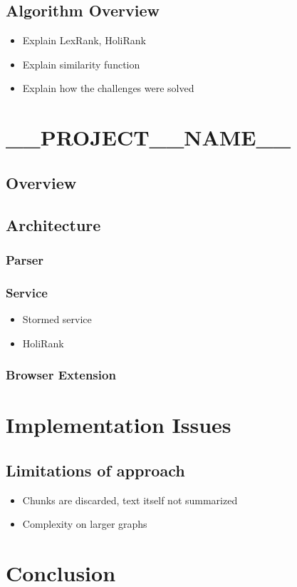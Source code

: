 \documentclass[a4paper]{usiinfbachelorproject}
\newcommand{\projectName}{\_\_PROJECT\_\_NAME\_\_}
\begin{document}
\subsection{Algorithm Overview}
\begin{itemize}
\item Explain LexRank, HoliRank
\item Explain similarity function
\item Explain how the challenges were solved
\end{itemize}

\section{\projectName}
\subsection{Overview}
\subsection{Architecture}
\subsubsection{Parser}
\subsubsection{Service}
\begin{itemize}
	\item Stormed service
\item HoliRank
\end{itemize}
\subsubsection{Browser Extension}


\section{Implementation Issues}
\subsection{Limitations of approach}
\begin{itemize}
\item Chunks are discarded, text itself not summarized
\item Complexity on larger graphs
\end{itemize}
\section{Conclusion}












\newpage
%
%
\end{document}
